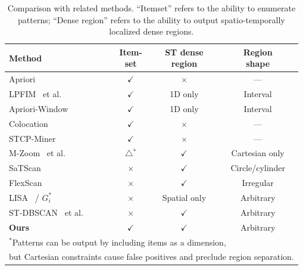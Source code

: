 \begin{table}[t]
\centering
\caption{Comparison with related methods.
``Itemset'' refers to the ability to enumerate patterns;
``Dense region'' refers to the ability to output
spatio-temporally localized dense regions.}
\label{tab:related}
\small
\begin{tabular}{lccc}
\toprule
Method & \shortstack{Item-\\set} & \shortstack{ST dense\\region} & \shortstack{Region\\shape} \\
\midrule
Apriori~\cite{agrawal1994apriori}
                                          & $\checkmark$ & $\times$     & ---          \\
LPFIM~\cite{mahanta2005lpfim} et al.
                                          & $\checkmark$ & 1D only      & Interval     \\
Apriori-Window~\cite{aprioriwindow}       & $\checkmark$ & 1D only      & Interval     \\
Colocation~\cite{shekhar2001colocation}
                                          & $\checkmark$ & $\times$     & ---          \\
STCP-Miner~\cite{qian2009stcolocation}   & $\checkmark$ & $\times$     & ---          \\
\midrule
M-Zoom~\cite{shin2016mzoom} et al.       & $\triangle$$^*$     & $\checkmark$ & Cartesian only \\
SaTScan~\cite{kulldorff1997spatial}       & $\times$     & $\checkmark$ & Circle/cylinder \\
FlexScan~\cite{tango2005flexscan}        & $\times$     & $\checkmark$ & Irregular    \\
LISA~\cite{anselin1995lisa}
  / $G_i^*$~\cite{ord1995getis}          & $\times$     & Spatial only & Arbitrary    \\
ST-DBSCAN~\cite{birant2007stdbscan} et al. & $\times$   & $\checkmark$ & Arbitrary    \\
\midrule
\textbf{Ours}                              & $\checkmark$ & $\checkmark$ & Arbitrary    \\
\bottomrule
\multicolumn{4}{l}{\scriptsize $^*$Patterns can be output by including items as a dimension,} \\
\multicolumn{4}{l}{\scriptsize \hspace{1em}but Cartesian constraints cause false positives and preclude region separation.}
\end{tabular}
\end{table}
